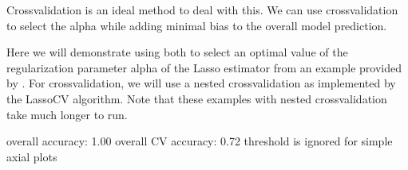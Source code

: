 \documentclass[letterpaper,10pt,english]{sphinxmanual}
\begin{document}
Cross\sphinxhyphen{}validation is an ideal method to deal with this.  We can use cross\sphinxhyphen{}validation to select the alpha while adding minimal bias to the overall model prediction.

Here we will demonstrate using both to select an optimal value of the regularization parameter alpha of the Lasso estimator from an example provided by . For cross\sphinxhyphen{}validation, we will use a nested cross\sphinxhyphen{}validation as implemented by the LassoCV algorithm.  Note that these examples with nested cross\sphinxhyphen{}validation take much longer to run.

\begin{sphinxVerbatim}[commandchars=\\\{\}]
   
                          
\end{sphinxVerbatim}

\begin{sphinxVerbatim}[commandchars=\\\{\}]
overall accuracy: 1.00
overall CV accuracy: 0.72
threshold is ignored for simple axial plots
\end{sphinxVerbatim}

\noindent{}

\noindent{}

\begin{sphinxVerbatim}[commandchars=\\\{\}]
  
       
\end{sphinxVerbatim}
\end{document}

